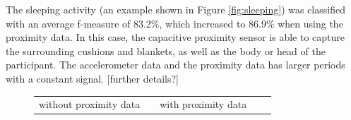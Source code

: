 \documentclass[runningheads,a4paper]{llncs}
\begin{document}
The sleeping activity (an example shown in Figure \ref{fig:sleeping}) was classified with an average f-measure of 83.2\%, which increased to 86.9\% when using the proximity data. In this case, the capacitive proximity sensor is able to capture the surrounding cushions and blankets, as well as the body or head of the participant. The accelerometer data and the proximity data has larger periods with a constant signal. [further details?]

\begin{figure}
	\setlength{\tabcolsep}{2.4pt}
	\centering
	\begin{scriptsize}
	\begin{tabular}{|ccccccccc|p{0.01cm}|ccccccccc|p{0.01cm}|l}
		\multicolumn{9}{c}{without proximity data} &\multicolumn{1}{c}{}& 
			\multicolumn{9}{c}{with proximity data} &\multicolumn{1}{c}{}&  \\ \cmidrule{1-9} \cmidrule{11-19} 
			

\end{tabular}
\end{scriptsize}
\end{figure}
\end{document}
